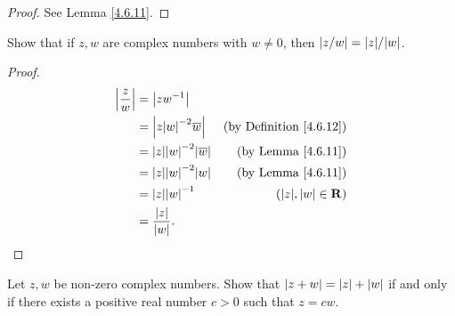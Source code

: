 \begin{proof}
    See Lemma \ref{4.6.11}.
\end{proof}

\begin{exercise}\label{ex 4.6.7}
    Show that if \(z, w\) are complex numbers with \(w \neq 0\), then \(\abs{z / w} = \abs{z} / \abs{w}\).
\end{exercise}

\begin{proof}
    \begin{align*}
        \abs{\frac{z}{w}} & = \abs{z w^{-1}}                                                                \\
                          & = \abs{z \abs{w}^{-2} \overline{w}}       & \text{(by Definition \ref{4.6.12})} \\
                          & = \abs{z} \abs{w}^{-2} \abs{\overline{w}} & \text{(by Lemma \ref{4.6.11})}      \\
                          & = \abs{z} \abs{w}^{-2} \abs{w}            & \text{(by Lemma \ref{4.6.11})}      \\
                          & = \abs{z} \abs{w}^{-1}                    & (\abs{z}, \abs{w} \in \R)           \\
                          & = \frac{\abs{z}}{\abs{w}}.
    \end{align*}
\end{proof}

\begin{exercise}\label{ex 4.6.8}
    Let \(z, w\) be non-zero complex numbers.
    Show that \(\left\lvert z + w\right\rvert = \left\lvert z\right\rvert + \left\lvert w\right\rvert\) if and only if there exists a positive real number \(c > 0\) such that \(z = cw\).
\end{exercise}

